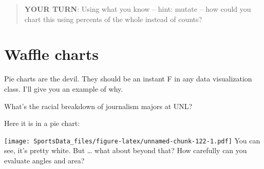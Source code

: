 \documentclass[]{book}
\newenvironment{Shaded}{\begin{snugshade}}{\end{snugshade}}
\newcommand{\KeywordTok}[1]{\textcolor[rgb]{0.13,0.29,0.53}{\textbf{#1}}}
\newcommand{\DataTypeTok}[1]{\textcolor[rgb]{0.13,0.29,0.53}{#1}}
\newcommand{\DecValTok}[1]{\textcolor[rgb]{0.00,0.00,0.81}{#1}}
\newcommand{\StringTok}[1]{\textcolor[rgb]{0.31,0.60,0.02}{#1}}
\newcommand{\OperatorTok}[1]{\textcolor[rgb]{0.81,0.36,0.00}{\textbf{#1}}}
\newcommand{\NormalTok}[1]{#1}
\begin{document}
\begin{quote}
\textbf{YOUR TURN}: Using what you know -- hint: mutate -- how could you
chart this using percents of the whole instead of counts?
\end{quote}

\chapter{Waffle charts}\label{waffle-charts}

Pie charts are the devil. They should be an instant F in any data
visualization class. I'll give you an example of why.

What's the racial breakdown of journalism majors at UNL?

Here it is in a pie chart:

\begin{Shaded}
\end{Shaded}

\texttt{[image: SportsData\_files/figure-latex/unnamed-chunk-122-1.pdf]}
You can see, it's pretty white. But \ldots{} what about beyond that? How
carefully can you evaluate angles and area?
\end{document}

